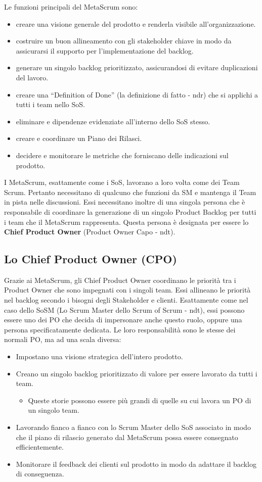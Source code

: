 \documentclass[12pt,a4paper,parskip=full]{scrartcl}
\begin{document}
Le funzioni principali del MetaScrum sono:
\begin{itemize}
\item creare una visione generale del prodotto e renderla visibile all'organizzazione.
\item costruire un buon allineamento con gli stakeholder chiave in modo da assicurarsi il supporto per l'implementazione del backlog.
\item generare un singolo backlog prioritizzato, assicurandosi di evitare duplicazioni del lavoro.
\item creare una ``Definition of Done'' (la definizione di fatto - ndr) che si applichi a tutti i team nello SoS.
\item eliminare e dipendenze evidenziate all'interno dello SoS stesso.
\item creare e coordinare un Piano dei Rilasci.
\item decidere e monitorare le metriche che forniscano delle indicazioni sul prodotto.
\end{itemize}
I MetaScrum, esattamente come i SoS, lavorano a loro volta come dei Team Scrum. Pertanto necessitano di qualcuno che funzioni da SM e mantenga il Team in pista nelle discussioni. Essi necessitano inoltre di una singola persona che è responsabile di coordinare la generazione di un singolo Product Backlog per tutti i team che il MetaScrum rappresenta. Questa persona è designata per essere lo \textbf{Chief Product Owner} (Product Owner Capo - ndt).

\subsection{Lo Chief Product Owner (CPO)}
Grazie ai MetaScrum, gli Chief Product Owner coordinano le priorità tra i Product Owner che sono impegnati con i singoli team. Essi allineano le priorità nel backlog secondo i bisogni degli Stakeholder e clienti. Esattamente come nel caso dello SoSM (Lo Scrum Master dello Scrum of Scrum - ndt), essi possono essere uno dei PO che decida di impersonare anche questo ruolo, oppure una persona specificatamente dedicata. Le loro responsabilità sono le stesse dei normali PO, ma ad una scala diversa: 
\begin{itemize}
\item Impostano una visione strategica dell'intero prodotto.
\item Creano un singolo backlog prioritizzato di valore per essere lavorato da tutti i team.
\begin{itemize}
\item Queste storie possono essere più grandi di quelle su cui lavora un PO di un singolo team.
\end{itemize}
\item Lavorando fianco a fianco con lo Scrum Master dello SoS associato in modo che il piano di rilascio generato dal MetaScrum possa essere consegnato efficientemente.
\item Monitorare il feedback dei clienti sul prodotto in modo da adattare il backlog di conseguenza.
\end{itemize}
\end{document}
